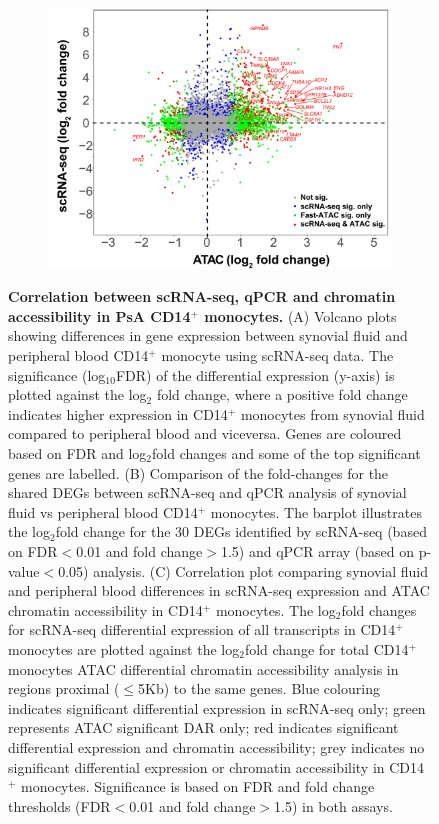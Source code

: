 \begin{figure}[htbp]
\begin{subfigure}[b]{0.50\textwidth}
\includegraphics[width=\textwidth]{./Appendix/pdfs/Chapter5/PSA_monocytes_scanpy_single_cell_SFvsPB_scRNA_ATAC_corelation}
\caption{}
\end{subfigure}
\caption[Differential gene expression between synovial fluid and peripheral blood PsA CD14$^+$ monocytes and correlation with qPCR and chromatin accessibility]{\textbf{Correlation between scRNA-seq, qPCR and chromatin accessibility in PsA CD14$^+$ monocytes.} (A) Volcano plots showing differences in gene expression between synovial fluid and peripheral blood CD14$^+$ monocyte using scRNA-seq data. The significance (log$_{10}$FDR) of the differential expression (y-axis) is plotted against the log${_2}$ fold change, where a positive fold change indicates higher expression in CD14$^+$ monocytes from synovial fluid compared to peripheral blood and viceversa. Genes are coloured based on FDR and log$_{2}$fold changes and some of the top significant genes are labelled. (B) Comparison of the fold-changes for the shared DEGs between scRNA-seq and qPCR analysis of synovial fluid vs peripheral blood CD14$^+$ monocytes. The barplot illustrates the log$_2$fold change for the 30 DEGs identified by scRNA-seq (based on FDR$<$0.01 and fold change$>$1.5) and qPCR array (based on p-value$<$0.05) analysis. (C) Correlation plot comparing synovial fluid and peripheral blood differences in scRNA-seq expression and ATAC chromatin accessibility in CD14$^+$ monocytes. The log$_2$fold changes for scRNA-seq differential expression of all transcripts in CD14$^+$ monocytes are plotted against the log$_2$fold change for total CD14$^+$ monocytes ATAC differential chromatin accessibility analysis in regions proximal ($\leq$5Kb) to the same genes. Blue colouring indicates significant differential expression in scRNA-seq only; green represents ATAC significant DAR only; red indicates significant differential expression and chromatin accessibility; grey indicates no significant differential expression or chromatin accessibility in CD14$^+$ monocytes. Significance is based on FDR and fold change thresholds (FDR$<$0.01 and fold change$>$1.5) in both assays.}
\label{figure:PSA_monocytes_scanpy_single_cell_volcano_and_qPCR_ATAC_correlation}
\end{figure}

